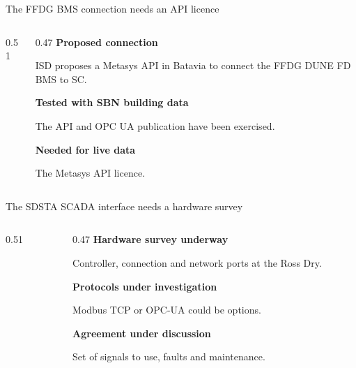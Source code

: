 \begin{frame}{The FFDG BMS connection needs an API licence}
\begin{columns}[T,onlytextwidth]
\begin{column}{0.51\textwidth}
\centering\siteboundarymap
\end{column}
\begin{column}{0.47\textwidth}
\textbf{Proposed connection}\par
ISD proposes a Metasys API in Batavia to connect the FFDG DUNE FD BMS to SC.\par\bigskip
\textbf{Tested with SBN building data}\par
The API and OPC UA publication have been exercised.\par\bigskip
\textbf{Needed for live data}\par
The Metasys API licence.
\end{column}
\end{columns}\par\bigskip
\raggedright{}
\end{frame}

\DpsFfdgUpdate

\begin{frame}{The SDSTA SCADA interface needs a hardware survey}
\begin{columns}[T,onlytextwidth]
\begin{column}{0.51\textwidth}
\centering\siteboundarymap
\end{column}
\begin{column}{0.47\textwidth}
\textbf{Hardware survey underway}\par
Controller, connection and network ports at the Ross Dry.\par\bigskip
\textbf{Protocols under investigation}\par
Modbus TCP or OPC-UA could be options.\par\bigskip
\textbf{Agreement under discussion}\par
Set of signals to use, faults and maintenance.
\end{column}
\end{columns}\par\bigskip
\raggedright{}
\end{frame}

